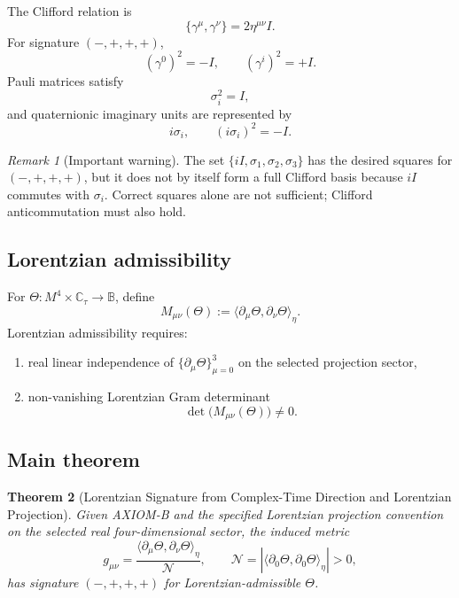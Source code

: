 \documentclass[12pt]{article}
\newtheorem{theorem}{Theorem}[section]
\theoremstyle{definition}
\theoremstyle{remark}
\newtheorem{remark}[theorem]{Remark}
\begin{document}
The Clifford relation is
\begin{equation}
\{\gamma^\mu,\gamma^\nu\}=2\eta^{\mu\nu}I.
\end{equation}
For signature $(-,+,+,+)$,
\begin{equation}
(\gamma^0)^2=-I,
\qquad
(\gamma^i)^2=+I.
\end{equation}
Pauli matrices satisfy
\begin{equation}
\sigma_i^2=I,
\end{equation}
and quaternionic imaginary units are represented by
\begin{equation}
i\sigma_i,
\qquad
(i\sigma_i)^2=-I.
\end{equation}

\begin{remark}[Important warning]
The set $\{iI,\sigma_1,\sigma_2,\sigma_3\}$ has the desired squares for $(-,+,+,+)$,
but it does not by itself form a full Clifford basis because $iI$ commutes with $\sigma_i$.
Correct squares alone are not sufficient; Clifford anticommutation must also hold.
\end{remark}

\subsection{Lorentzian admissibility}

For $\Theta: M^4\times\mathbb C_\tau\to\mathbb B$, define
\begin{equation}
M_{\mu\nu}(\Theta):=\langle \partial_\mu\Theta,\partial_\nu\Theta\rangle_\eta.
\end{equation}
Lorentzian admissibility requires:
\begin{enumerate}
  \item real linear independence of $\{\partial_\mu\Theta\}_{\mu=0}^3$ on the selected projection sector,
  \item non-vanishing Lorentzian Gram determinant
  \begin{equation}
  \det\!\big(M_{\mu\nu}(\Theta)\big)\neq 0.
  \end{equation}
\end{enumerate}

\subsection{Main theorem}

\begin{theorem}[Lorentzian Signature from Complex-Time Direction and Lorentzian Projection]
\label{thm:axiomB_signature}
\label{thm:signature}
Given AXIOM-B and the specified Lorentzian projection convention on the selected real four-dimensional sector,
the induced metric
\begin{equation}
\label{eq:induced-metric-step3}
g_{\mu\nu}=\frac{\langle \partial_\mu\Theta,\partial_\nu\Theta\rangle_\eta}{\mathcal N},
\qquad
\mathcal N=\left|\langle \partial_0\Theta,\partial_0\Theta\rangle_\eta\right|>0,
\end{equation}
has signature $(-,+,+,+)$ for Lorentzian-admissible $\Theta$.
\end{theorem}
\end{document}
